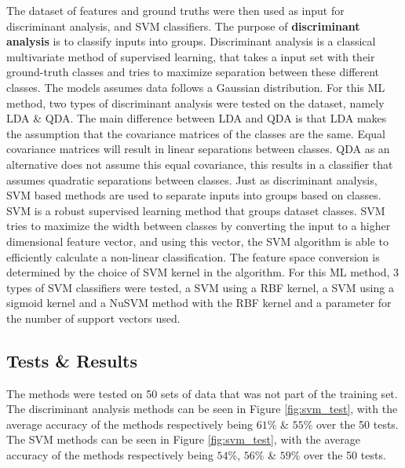 \documentclass[../main.tex]{subfiles}
\begin{document}
The dataset of features and ground truths were then used as input for discriminant analysis, and \gls{SVM} classifiers.
The purpose of \textbf{discriminant analysis} is to classify inputs into groups.
Discriminant analysis is a classical multivariate method of supervised learning, that takes a input set with their ground-truth classes and tries to maximize separation between these different classes.
The models assumes data follows a Gaussian distribution. 
For this \gls{ML} method, two types of discriminant analysis were tested on the dataset, namely \gls{LDA} \& \gls{QDA}.
The main difference between \gls{LDA} and \gls{QDA} is that \gls{LDA} makes the assumption that the covariance matrices of the classes are the same.
Equal covariance matrices will result in linear separations between classes.
\gls{QDA} as an alternative does not assume this equal covariance, this results in a classifier that assumes quadratic separations between classes.
Just as discriminant analysis, \gls{SVM} based methods are used to separate inputs into groups based on classes.
\gls{SVM} is a robust supervised learning method that groups dataset classes.
\gls{SVM} tries to maximize the width between classes by converting the input to a higher dimensional feature vector, and using this vector, the \gls{SVM} algorithm is able to efficiently calculate a non-linear classification.
The feature space conversion is determined by the choice of \gls{SVM} kernel in the algorithm.
For this \gls{ML} method, 3 types of \gls{SVM} classifiers were tested, a \gls{SVM} using a \gls{RBF} kernel, a \gls{SVM} using a sigmoid kernel and a Nu\gls{SVM} method with the \gls{RBF} kernel and a parameter for the number of support vectors used.

\subsection{Tests \& Results}

The methods were tested on 50 sets of data that was not part of the training set.
The discriminant analysis methods can be seen in Figure \ref{fig:svm_test}, with the average accuracy of the methods respectively being $61\%$ \& $55\%$ over the 50 tests.
The \gls{SVM} methods can be seen in Figure \ref{fig:svm_test}, with the average accuracy of the methods respectively being $54\%$, $56\%$ \& $59\%$ over the 50 tests.
\end{document}
